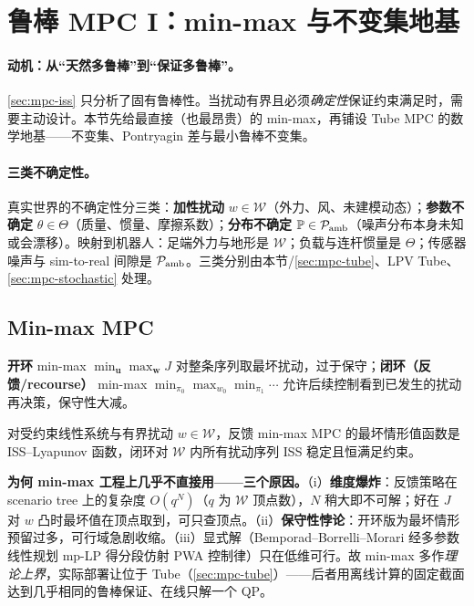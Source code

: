 \section{鲁棒 MPC I：min-max 与不变集地基}
\label{sec:mpc-minmax-mrpi}

\paragraph{动机：从“天然多鲁棒”到“保证多鲁棒”。}
\cref{sec:mpc-iss} 只分析了固有鲁棒性。当扰动有界且必须\emph{确定性}保证约束满足时，需要主动设计。本节先给最直接（也最昂贵）的 min-max，再铺设 Tube MPC 的数学地基——不变集、Pontryagin 差与最小鲁棒不变集。

\paragraph{三类不确定性。}
真实世界的不确定性分三类：\textbf{加性扰动} $w\in\mathcal W$（外力、风、未建模动态）；\textbf{参数不确定} $\theta\in\Theta$（质量、惯量、摩擦系数）；\textbf{分布不确定} $\mathbb P\in\mathcal P_{\rm amb}$（噪声分布本身未知或会漂移）。映射到机器人：足端外力与地形是 $\mathcal W$；负载与连杆惯量是 $\Theta$；传感器噪声与 sim-to-real 间隙是 $\mathcal P_{\rm amb}$。三类分别由本节/\cref{sec:mpc-tube}、LPV Tube、\cref{sec:mpc-stochastic} 处理。

\subsection{Min-max MPC}
\label{sec:mpc-minmax}
\textbf{开环} min-max $\min_{\mathbf u}\max_{\mathbf w}J$ 对整条序列取最坏扰动，过于保守；\textbf{闭环（反馈/recourse）} min-max $\min_{\pi_0}\max_{w_0}\min_{\pi_1}\cdots$ 允许后续控制看到已发生的扰动再决策，保守性大减。

\begin{theorem}
\label{thm:mpc-minmax}
对受约束线性系统与有界扰动 $w\in\mathcal W$，反馈 min-max MPC 的最坏情形值函数是 ISS--Lyapunov 函数，闭环对 $\mathcal W$ 内所有扰动序列 ISS 稳定且恒满足约束。
\end{theorem}

\begin{remark}
\textbf{为何 min-max 工程上几乎不直接用——三个原因。}\;（i）\textbf{维度爆炸}：反馈策略在 scenario tree 上的复杂度 $O(q^N)$（$q$ 为 $\mathcal W$ 顶点数），$N$ 稍大即不可解；好在 $J$ 对 $w$ 凸时最坏值在顶点取到，可只查顶点。（ii）\textbf{保守性悖论}：开环版为最坏情形预留过多，可行域急剧收缩。（iii）显式解（Bemporad--Borrelli--Morari 经多参数线性规划 mp-LP 得分段仿射 PWA 控制律）只在低维可行。故 min-max 多作\emph{理论上界}，实际部署让位于 Tube（\cref{sec:mpc-tube}）——后者用离线计算的固定截面达到几乎相同的鲁棒保证、在线只解一个 QP。
\end{remark}

